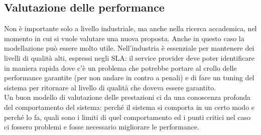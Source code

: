 \documentclass{article}
\begin{document}
\subsection{Valutazione delle performance}
Non è importante solo a livello industriale, ma anche nella ricerca accademica, nel momento in cui si vuole valutare una nuova proposta. Anche in questo caso la modellazione può essere molto utile. Nell'industria è essenziale per mantenere dei livelli di qualità alti, espressi negli SLA: il service provider deve poter identificare in maniera rapida dove c'è un problema che potrebbe portare al crollo delle performance garantite (per non andare in contro a penali) e di fare un tuning del sistema per ritornare al livello di qualità che doveva essere garantito.\\ Un buon modello di valutazione delle prestazioni ci da una conoscenza profonda del comportamento del sistema: perché il sistema si comporta in un certo modo e perché lo fa, quali sono i limiti di quel comportamento ed i punti critici nel caso ci fossero problemi e fosse necessario migliorare le performance.
\end{document}
